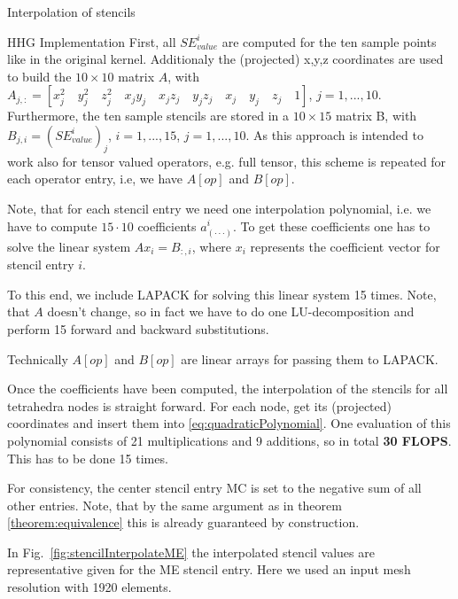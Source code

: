 \documentclass[a4paper,11pt,reqno]{amsart}
\numberwithin{figure}{section}
\numberwithin{table}{section}
\numberwithin{figure}{section}
\def\si{SE_{value}^i}
\begin{document}
\begin{section}{Interpolation of stencils}
\begin{subsection}{HHG Implementation}
First, all $\si$ are computed for the ten sample points like in the original kernel. 
Additionaly the (projected) x,y,z coordinates are used to build the $10\times10$ 
matrix $A$, with 
$A_{j,:} = \left[x_j^2\quad y_j^2\quad z_j^2\quad x_jy_j\quad x_jz_j\quad y_jz_j\quad
x_j\quad y_j\quad z_j\quad 1\right]$, $j = 1,...,10$.
Furthermore, the ten sample stencils are stored in a $10\times15$ matrix B,
with $B_{j,i} = \left(\si\right)_j$, $i = 1,...,15$, $j=1,...,10$. 
As this approach is intended to work 
also for tensor valued operators, e.g. full tensor, this scheme is repeated for each
operator entry, i.e, we have $A[op]$ and $B[op]$.

Note, that for each stencil entry we need one interpolation polynomial, i.e. we
have to compute $15\cdot10$ coefficients $a_{(\cdot\cdot\cdot)}^i$. To get these
coefficients one has to solve the linear system $Ax_i = B_{:,i}$,
where $x_i$ represents the coefficient vector for stencil entry $i$.

To this end, we include LAPACK for solving this linear system 15 times. 
Note, that $A$ doesn't change, so in fact we have to do one LU-decomposition
and perform 15 forward and backward substitutions.

Technically $A[op]$ and $B[op]$ are linear arrays for passing them to LAPACK. 

Once the coefficients have been computed, the interpolation of the stencils for
all tetrahedra nodes is straight forward. For each node, get its (projected) coordinates
and insert them into \eqref{eq:quadraticPolynomial}. One evaluation
of this polynomial consists of 21 multiplications and 9 additions, so in total 
\textbf{30 FLOPS}. This has to be done 15 times. 

For consistency, the center stencil
entry MC is set to the negative sum of all other entries.
Note, that by the same argument as in theorem \ref{theorem:equivalence}
this is already guaranteed by construction.

In Fig.~\ref{fig:stencilInterpolateME} the interpolated stencil values are representative
given for the ME stencil entry. Here we used an input mesh resolution with 1920 elements.



\end{subsection}
\end{section}
\end{document}
